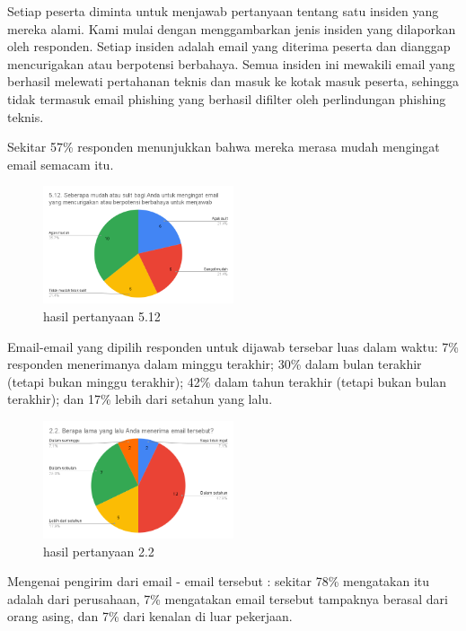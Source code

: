 \documentclass[lettersize,journal]{IEEEtran}
\begin{document}
Setiap peserta diminta untuk menjawab pertanyaan tentang satu insiden yang
mereka alami. Kami mulai dengan menggambarkan jenis insiden yang dilaporkan
oleh responden. Setiap insiden adalah email yang diterima peserta dan dianggap
mencurigakan atau berpotensi berbahaya. Semua insiden ini mewakili email yang
berhasil melewati pertahanan teknis dan masuk ke kotak masuk peserta, sehingga
tidak termasuk email phishing yang berhasil difilter oleh perlindungan phishing
teknis.

Sekitar 57\% responden menunjukkan bahwa mereka merasa mudah mengingat email
semacam itu.

\begin{figure}[h!]
  \centering
  \includegraphics[width=0.5\textwidth]{image/5.12.png}
  \caption{hasil pertanyaan 5.12}
  \label{fig:pertanyaan_5.12}
\end{figure}

Email-email yang dipilih responden untuk dijawab tersebar luas dalam waktu: 7\%
responden menerimanya dalam minggu terakhir; 30\% dalam bulan terakhir (tetapi
bukan minggu terakhir); 42\% dalam tahun terakhir (tetapi bukan bulan
terakhir); dan 17\% lebih dari setahun yang lalu.

\begin{figure}[h!]
  \centering
  \includegraphics[width=0.5\textwidth]{image/2.2.png}
  \caption{hasil pertanyaan 2.2}
  \label{fig:pertanyaan_2.2}
\end{figure}

Mengenai pengirim dari email - email tersebut : sekitar 78\% mengatakan itu
adalah dari perusahaan, 7\% mengatakan email tersebut tampaknya berasal dari
orang asing, dan 7\% dari kenalan di luar pekerjaan.
\end{document}

